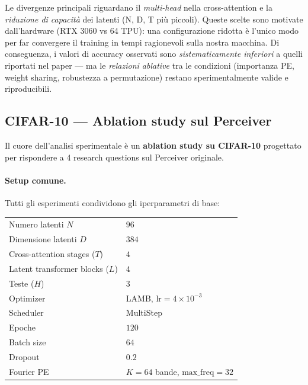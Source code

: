 \documentclass[
  11pt,
]{article}
\begin{document}
\begin{notabox}[title={\textbf{Implicazioni delle divergenze}}]
Le divergenze principali riguardano il \emph{multi-head} nella cross-attention e la \emph{riduzione di capacità} dei latenti (N, D, T più piccoli). Queste scelte sono motivate dall'hardware (RTX 3060 vs 64 TPU): una configurazione ridotta è l'unico modo per far convergere il training in tempi ragionevoli sulla nostra macchina. Di conseguenza, i valori di accuracy osservati sono \emph{sistematicamente inferiori} a quelli riportati nel paper --- ma le \emph{relazioni ablative} tra le condizioni (importanza PE, weight sharing, robustezza a permutazione) restano sperimentalmente valide e riproducibili.
\end{notabox}

\subsection{CIFAR-10 --- Ablation study sul Perceiver}
\label{sec:progetto-cifar10}

Il cuore dell'analisi sperimentale è un \textbf{ablation study su CIFAR-10} progettato per rispondere a 4 research questions sul Perceiver originale.

\paragraph{Setup comune.} Tutti gli esperimenti condividono gli iperparametri di base:

\begin{center}
{\small
\begin{tabular}{@{}ll@{}}
\toprule
Numero latenti $N$ & $96$ \\
Dimensione latenti $D$ & $384$ \\
Cross-attention stages ($T$) & $4$ \\
Latent transformer blocks ($L$) & $4$ \\
Teste ($H$) & $3$ \\
Optimizer & LAMB, $\text{lr} = 4 \times 10^{-3}$ \\
Scheduler & MultiStep \\
Epoche & $120$ \\
Batch size & $64$ \\
Dropout & $0.2$ \\
Fourier PE & $K=64$ bande, $\text{max\_freq}=32$ \\
\bottomrule
\end{tabular}
}
\end{center}
\end{document}
